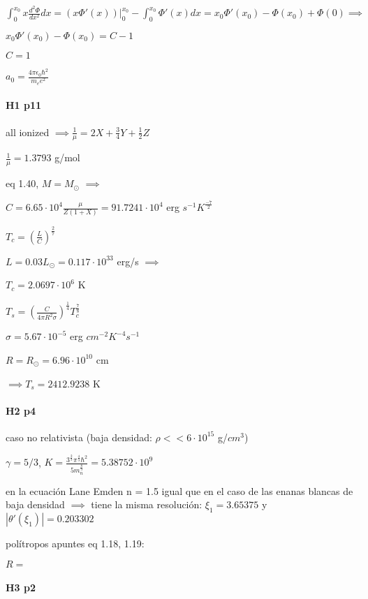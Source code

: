 \documentclass[12pt]{book}
\begin{document}
$\int_0^{x_0}{x \frac{d^2\Phi}{dx^2} dx } = (x \Phi'(x))|_0^{x_0} - \int_0^{x_0}{\Phi'(x) dx } = x_0 \Phi'(x_0) - \Phi(x_0) + \Phi(0) \implies$

$x_0 \Phi'(x_0) - \Phi(x_0) = C - 1$

$C = 1$

$a_0 = \frac{4 \pi \epsilon_0 \hbar^2}{m_e e^2}$  

\paragraph{H1 p11}


all ionized $\implies \frac{1}{\mu} = 2 X + \frac{3}{4} Y + \frac{1}{2} Z$

$\frac{1}{\mu}  = 1.3793$ g/mol

eq 1.40, $M = M_{\odot}$ $\implies$

$C = 6.65 \cdot 10^4 \frac{\mu}{Z(1+X)} = 91.7241 \cdot 10^4$ erg $s^{-1} K^{\frac{-7}{2}}$ 

$T_c = (\frac{L}{C})^{\frac{2}{7}}$

$L = 0.03 L_{\odot} = 0.117 \cdot 10^{33} $ erg/s $\implies$

$T_c = 2.0697 \cdot 10^6$ K

$T_s = (\frac{C}{4 \pi R^2 \sigma})^{\frac{1}{4}} T_c^{\frac{7}{8}}$

$\sigma = 5.67 \cdot 10^{-5}$ erg $cm^{-2} K^{-4} s^{-1}$

$R = R_{\odot} = 6.96 \cdot 10^{10}$ cm

$\implies T_s = 2412.9238$ K


\paragraph{H2 p4}

caso no relativista (baja densidad: $\rho << 6  \cdot 10^{15} $ g/$cm^3$)

$\gamma = 5/3$, $K = \frac{3^{\frac{2}{3}} \pi^{\frac{4}{3}} \hbar^2 }{5 m_n^{\frac{8}{3}}} = 5.38752 \cdot 10^9$

en la ecuación Lane Emden n = 1.5 igual que en el caso de las enanas blancas  de baja densidad $\implies $ tiene la misma resolución:
$\xi_1= 3.65375$ y $|\theta'(\xi_1)|= 0.203302$  

polítropos apuntes eq 1.18, 1.19:

$R = $


\paragraph{H3 p2}
\end{document}
